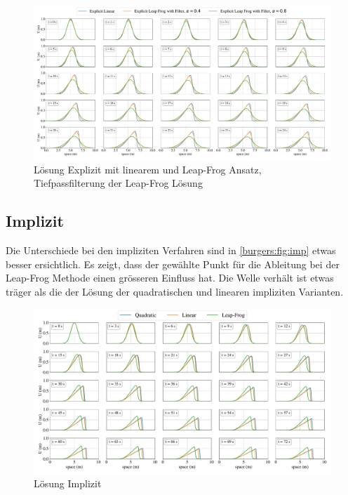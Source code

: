 	  \begin{figure}
		\centering
		\includegraphics[width=1\textwidth]{papers/burgers/BurgersEquation/time_filter.pdf}
		\caption{L\"osung Explizit mit linearem und Leap-Frog Ansatz, Tiefpassfilterung der Leap-Frog L\"osung }
		\label{burgers:fig:time}
		\end{figure}
	

	\subsection{Implizit}

	Die Unterschiede bei den impliziten Verfahren sind in \autoref{burgers:fig:imp} etwas besser ersichtlich.
	Es zeigt, dass der gew\"ahlte Punkt f\"ur die Ableitung bei der Leap-Frog Methode einen gr\"osseren Einfluss hat.
	Die Welle verh\"alt ist etwas tr\"ager als die der L\"osung der quadratischen und linearen impliziten Varianten.

    \begin{figure}
	\centering
	\includegraphics[width=1\textwidth]{papers/burgers/BurgersEquation/imp_paper.pdf}
	\caption{L\"osung Implizit}
	\label{burgers:fig:imp}
	\end{figure}
